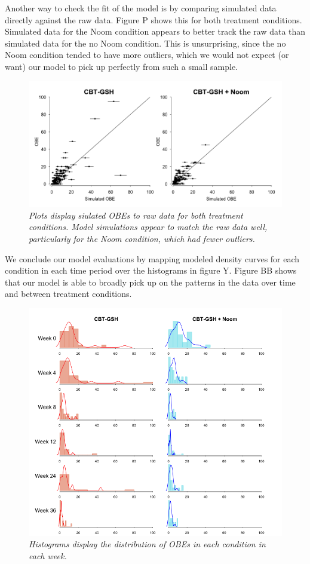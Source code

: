 \documentclass[12pt, oneside]{article}
\begin{document}
Another way to check the fit of the model is by comparing simulated data directly against the raw data.  Figure P shows this for both treatment conditions.  Simulated data for the Noom condition appears to better track the raw data than simulated data for the no Noom condition.  This is unsurprising, since the no Noom condition tended to have more outliers, which we would not expect (or want) our model to pick up perfectly from such a small sample.  
\\

\begin{figure}
\centering
\includegraphics[width=\textwidth, height=\textheight, keepaspectratio]{obe_ppcs.png}
\caption{\emph{Plots display siulated OBEs to raw data for both treatment conditions.  Model simulations appear to match the raw data well, particularly for the Noom condition, which had fewer outliers.}}
\end{figure}

We conclude our model evaluations by mapping modeled density curves for each condition in each time period over the histograms in figure Y.  Figure BB shows that our model is able to broadly pick up on the patterns in the data over time and between treatment conditions.

\begin{figure}[h]
\centering
\includegraphics[width=\textwidth, height=\textheight, keepaspectratio]{ppc_hist_dens.png}
\caption{\emph{Histograms display the distribution of OBEs in each condition in each week.}}
\end{figure}
\end{document}

